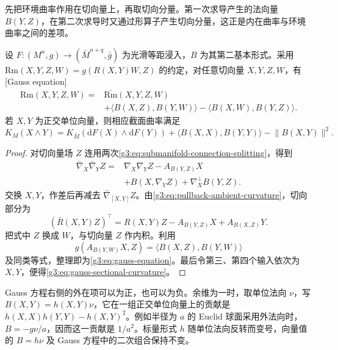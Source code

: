先把环境曲率作用在切向量上，再取切向分量。第一次求导产生的法向量 \(B(Y,Z)\)，在第二次求导时又通过形算子产生切向分量，这正是内在曲率与环境曲率之间的差项。

\begin{theorem}\label{g3:thm:gauss-equation}
	设 \(F\colon(M^n,g)\to(\bar M^{n+q},\bar g)\) 为光滑等距浸入，\(B\) 为其第二基本形式。采用 \(\mathrm{Rm}(X,Y,Z,W)=g(R(X,Y)W,Z)\) 的约定，对任意切向量 \(X,Y,Z,W\)，有[Gauss equation]
	\begin{equation}\label{g3:eq:gauss-equation}
		\begin{aligned}
		\mathrm{Rm}(X,Y,Z,W)
		={}&\bar{\mathrm{Rm}}(X,Y,Z,W)\\
		&+\langle B(X,Z),B(Y,W)\rangle
		-\langle B(X,W),B(Y,Z)\rangle.
		\end{aligned}
	\end{equation}
	若 \(X,Y\) 为正交单位向量，则相应截面曲率满足
	\begin{equation}\label{g3:eq:gauss-sectional-curvature}
		K_M(X\wedge Y)
		=K_{\bar M}(\mathrm dF(X)\wedge \mathrm dF(Y))
		+\langle B(X,X),B(Y,Y)\rangle-\lVert B(X,Y)\rVert^2.
	\end{equation}
\end{theorem}
\begin{proof}
	对切向量场 \(Z\) 连用两次\eqref{g3:eq:submanifold-connection-splitting}，得到
	\begin{equation}\label{g3:eq:gauss-double-derivative}
		\begin{aligned}
		\bar\nabla_X\bar\nabla_YZ
		={}&\nabla_X\nabla_YZ-A_{B(Y,Z)}X\\
		&+B(X,\nabla_YZ)+\nabla_X^\perp B(Y,Z).
		\end{aligned}
	\end{equation}
	交换 \(X,Y\)，作差后再减去 \(\bar\nabla_{[X,Y]}Z\)。由\eqref{g3:eq:pullback-ambient-curvature}，切向部分为
	\begin{equation}\label{g3:eq:gauss-vector-equation}
		(\bar R(X,Y)Z)^\top
		=R(X,Y)Z-A_{B(Y,Z)}X+A_{B(X,Z)}Y.
	\end{equation}
	把式中 \(Z\) 换成 \(W\)，与切向量 \(Z\) 作内积。利用
	\[
		g(A_{B(Y,W)}X,Z)=\langle B(X,Z),B(Y,W)\rangle
	\]
	及同类等式，整理即为\eqref{g3:eq:gauss-equation}。最后令第三、第四个输入依次为 \(X,Y\)，便得\eqref{g3:eq:gauss-sectional-curvature}。
\end{proof}

Gauss 方程右侧的外在项可以为正，也可以为负。余维为一时，取单位法向 \(\nu\)，写 \(B(X,Y)=h(X,Y)\nu\)，它在一组正交单位向量上的贡献是 \(h(X,X)h(Y,Y)-h(X,Y)^2\)。例如半径为 \(a\) 的 Euclid 球面采用外法向时，\(B=-g\nu/a\)，因而这一贡献是 \(1/a^2\)。标量形式 \(h\) 随单位法向反转而变号，向量值的 \(B=h\nu\) 及 Gauss 方程中的二次组合保持不变。

